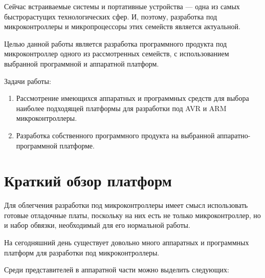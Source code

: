 \documentclass{altsu-report}
\begin{document}
Сейчас встраиваемые системы и портативные устройства --- одна из самых быстрорастущих технологических сфер. И, поэтому, разработка под микроконтроллеры и микропроцессоры этих семейств является актуальной.

Целью данной работы является разработка программного продукта под микроконтроллер одного из рассмотренных семейств, с использованием выбранной программной и аппаратной платформ.

Задачи работы:

\begin{enumerate}
    \item Рассмотрение имеющихся аппаратных и программных средств для выбора наиболее подходящей платформы для разработки под AVR и ARM микроконтроллеры.
    
    \item Разработка собственного программного продукта на выбранной аппаратно-программной платформе.
\end{enumerate}

\chapter{Краткий обзор платформ}

Для облегчения разработки под микроконтроллеры имеет смысл использовать готовые отладочные платы, поскольку на них есть не только микроконтроллер, но и набор обвязки, необходимый для его нормальной работы.

На сегодняшний день существует довольно много аппаратных и программных платформ для разработки под микроконтроллеры.

Среди представителей в аппаратной части можно выделить следующих:
\end{document}
